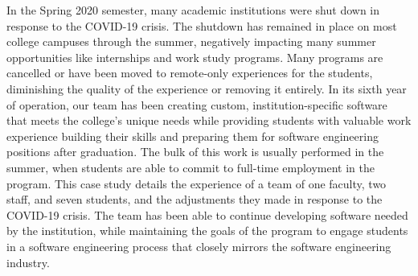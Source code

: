 In the Spring 2020 semester, many academic institutions were shut down in response to the COVID-19 crisis.
The shutdown has remained in place on most college campuses through the summer, negatively impacting many summer opportunities like internships and work study programs. Many programs are cancelled or have been moved to remote-only experiences for the students, diminishing the quality of the experience or removing it entirely. In its sixth year of operation, our team has been creating custom, institution-specific software that meets the college's unique needs while providing students with valuable work experience building their skills and preparing them for software engineering positions after graduation. The bulk of this work is usually performed in the summer, when students are able to commit to full-time employment in the program. This case study details the experience of a team of one faculty, two staff, and seven students, and the adjustments they made in response to the COVID-19 crisis. The team has been able to continue developing software needed by the institution, while maintaining the goals of the program to engage students in a software engineering process that closely mirrors the software engineering industry.
